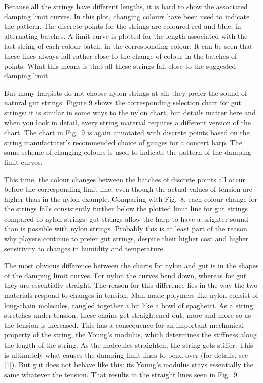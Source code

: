   Because all the strings have different lengths, it is hard to show the 
  associated damping limit curves. In this plot, changing colours have been 
  used to indicate the pattern. The discrete points for the strings are 
  coloured red and blue, in alternating batches. A limit curve is plotted for 
  the length associated with the last string of each colour batch, in the 
  corresponding colour. It can be seen that these lines always fall rather 
  close to the change of colour in the batches of points. What this means is 
  that all these strings fall close to the suggested damping limit. 

  But many harpists do not choose nylon strings at all: they prefer the sound 
  of natural gut strings. Figure 9 shows the corresponding selection chart for 
  gut strings: it is similar in some ways to the nylon chart, but details 
  matter here and when you look in detail, every string material requires a 
  different version of the chart. The chart in Fig.\ 9 is again annotated with 
  discrete points based on the string manufacturer's recommended choice of 
  gauges for a concert harp. The same scheme of changing colours is used to 
  indicate the pattern of the damping limit curves. 


  This time, the colour changes between the batches of discrete points all 
  occur before the corresponding limit line, even though the actual values of 
  tension are higher than in the nylon example. Comparing with Fig.\ 8, each 
  colour change for the strings falls consistently further below the plotted 
  limit line for gut strings compared to nylon strings: gut strings allow the 
  harp to have a brighter sound than is possible with nylon strings. Probably 
  this is at least part of the reason why players continue to prefer gut 
  strings, despite their higher cost and higher sensitivity to changes in 
  humidity and temperature. 

  The most obvious difference between the charts for nylon and gut is in the 
  shapes of the damping limit curves. For nylon the curves bend down, whereas 
  for gut they are essentially straight. The reason for this difference lies in 
  the way the two materials respond to changes in tension. Man-made polymers 
  like nylon consist of long-chain molecules, tangled together a bit like a 
  bowl of spaghetti. As a string stretches under tension, these chains get 
  straightened out; more and more so as the tension is increased. This has a 
  consequence for an important mechanical property of the string, the Young's 
  modulus, which determines the stiffness along the length of the string. As 
  the molecules straighten, the string gets stiffer. This is ultimately what 
  causes the damping limit lines to bend over (for details, see [1]). But gut 
  does not behave like this: its Young's modulus stays essentially the same 
  whatever the tension. That results in the straight lines seen in Fig.\ 9. 


